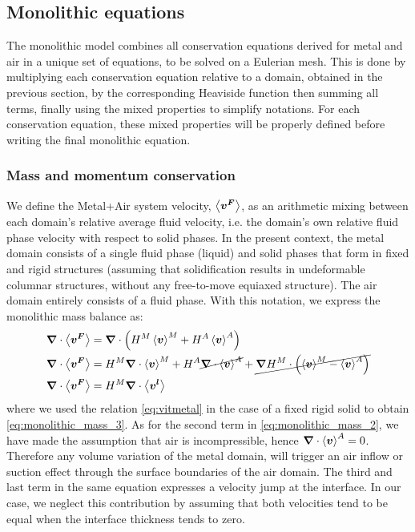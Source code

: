 \subsection{Monolithic equations}
 
The monolithic model combines all conservation equations derived for metal and air in a unique set of equations, to be solved on a Eulerian mesh.
This is done by multiplying each conservation equation relative to a domain, obtained in the previous section, by the corresponding Heaviside
function then summing all terms, finally using the mixed properties to simplify notations.
For each conservation equation, these mixed properties will be properly defined before writing the final monolithic equation.

\subsubsection{Mass and momentum conservation}
We define the Metal+Air system velocity, $\left \langle \boldsymbol{v^F} \right \rangle$, as an arithmetic mixing between each domain's relative average fluid velocity, 
i.e. the domain's own relative fluid phase velocity with respect to solid phases.
In the present context, the metal domain consists of a single fluid phase (liquid) and solid phases that form in fixed and rigid structures 
(assuming that solidification results in undeformable columnar structures, without any free-to-move equiaxed structure).
The air domain entirely consists of a fluid phase.
With this notation, we express the monolithic mass balance as:
\begin{align}
\label{eq:monolithic_mass_1}
& \boldsymbol{\nabla} \cdot \left \langle \boldsymbol{v^F} \right \rangle = \boldsymbol{\nabla} \cdot \left( H^M \left \langle \boldsymbol{v} \right \rangle^M + H^A \left \langle \boldsymbol{v} \right \rangle^A \right) \\
\label{eq:monolithic_mass_2}
& \boldsymbol{\nabla} \cdot \left \langle \boldsymbol{v^F} \right \rangle = H^M \boldsymbol{\nabla} \cdot \left \langle \boldsymbol{v} \right \rangle^M + H^A \cancel{\boldsymbol{\nabla} \cdot \left \langle \boldsymbol{v} \right \rangle^A} + \cancel{\boldsymbol{\nabla} H^M \cdot \left( \left \langle \boldsymbol{v} \right \rangle^M - \left \langle \boldsymbol{v} \right \rangle^A \right)}\\
\label{eq:monolithic_mass_3}
& \boldsymbol{\nabla} \cdot \left \langle \boldsymbol{v^F} \right \rangle = H^M \boldsymbol{\nabla} \cdot \left \langle \boldsymbol{v^l} \right \rangle
\end{align}
where we used the relation \cref{eq:vitmetal} in the case of a fixed rigid solid to obtain \cref{eq:monolithic_mass_3}.
As for the second term in \cref{eq:monolithic_mass_2}, we have made the assumption that air is incompressible, hence $\boldsymbol{\nabla} \cdot \left \langle \boldsymbol{v} \right \rangle^A= 0$. 
Therefore any volume variation of the metal domain, will trigger an air inflow or suction effect through the surface boundaries of
the air domain. The third and last term in the same equation 
expresses a velocity jump at the interface. 
In our case, we neglect this contribution by assuming that both velocities tend to be equal
when the interface thickness tends to zero. 

